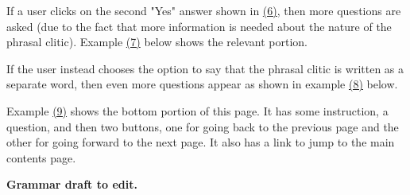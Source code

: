 \documentclass[12pt]{article}
\begin{document}
{\vspace{12pt}}\par\indent If a user clicks on the second "Yes" answer shown in \hyperlink{xPossessor2}{(6)}, then more questions are asked (due to the fact that more information is needed about the nature of the phrasal clitic). Example \hyperlink{xPossessor2c}{(7)} below shows the relevant portion.\par{}{\vspace{12pt}\raggedright{}
\vspace{12pt}}\par\indent If the user instead chooses the option to say that the phrasal clitic is written as a separate word, then even more questions appear as shown in example \hyperlink{xPossessors2b}{(8)} below.\par{}{\vspace{12pt}\raggedright{}
}{\vspace{12pt}\raggedright{}
\vspace{12pt}}\noindent Example \hyperlink{xPossessors3}{(9)} shows the bottom portion of this page. It has some instruction, a question, and then two buttons, one for going back to the previous page and the other for going forward to the next page. It also has a link to jump to the main contents page.\par{}\vspace{.25in}\noindent\protect\hypertarget{sGrammar}{{\noindent
\textbf{{ }}}}{\noindent
\textbf{{\protect\noindent
Grammar draft to edit. }}}
\end{document}
